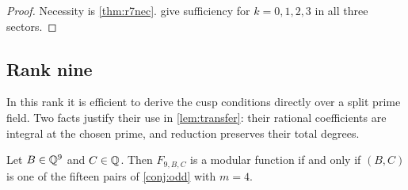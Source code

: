 \begin{proof}
Necessity is \cref{thm:r7nec}.  give sufficiency for $k=0,1,2,3$ in all three sectors.
\end{proof}

\subsection{Rank nine}
In this rank it is efficient to derive the cusp conditions directly over a split prime field. Two facts justify their use in \cref{lem:transfer}: their rational coefficients are integral at the chosen prime, and reduction preserves their total degrees.

\begin{theorem}\label{thm:r9}
Let $B\in\mathbb{Q}^9$ and $C\in\mathbb{Q}$. Then $F_{9,B,C}$ is a modular function if and only if $(B,C)$ is one of the fifteen pairs of \cref{conj:odd} with $m=4$.
\end{theorem}

